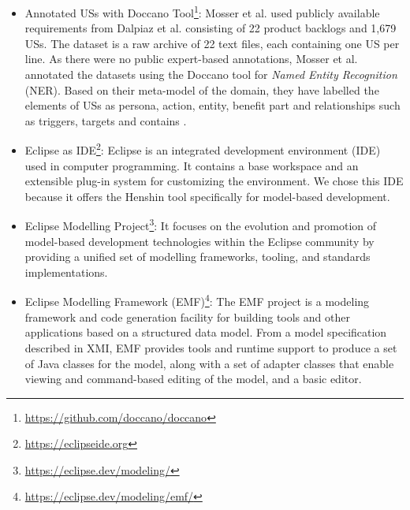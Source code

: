\begin{itemize}
	\item Annotated USs with Doccano Tool\footnote{\href{https://github.com/doccano/doccano}{https://github.com/doccano/doccano}}: Mosser et al. used publicly available requirements from Dalpiaz et al.\cite{Dalpiaz2018} consisting of 22 product backlogs and 1,679 USs. The dataset is a raw archive of 22 text files, each containing one US per line. As there were no public expert-based annotations, Mosser et al. annotated the datasets using the Doccano tool for \textit{Named Entity Recognition} (NER). Based on their meta-model of the domain, they have labelled the elements of USs as persona, action, entity, benefit part and relationships such as triggers, targets and contains \cite{mosser2022modelling}.
	
	
	\item Eclipse as IDE\footnote{\href{https://eclipseide.org/}{https://eclipseide.org}}: Eclipse is an integrated development environment (IDE) used in computer programming. It contains a base workspace and an extensible plug-in system for customizing the environment.
	We chose this IDE because it offers the Henshin tool specifically for model-based development.
	
	\item Eclipse Modelling Project\footnote{\href{https://eclipse.dev/modeling/}{https://eclipse.dev/modeling/}}: It focuses on the evolution and promotion of model-based development technologies within the Eclipse community by providing a unified set of modelling frameworks, tooling, and standards implementations.
	
	\item Eclipse Modelling Framework (EMF)\footnote{\href{https://eclipse.dev/modeling/emf/}{https://eclipse.dev/modeling/emf/}}: The EMF project is a modeling framework and code generation facility for building tools and other applications based on a structured data model. From a model specification described in XMI, EMF provides tools and runtime support to produce a set of Java classes for the model, along with a set of adapter classes that enable viewing and command-based editing of the model, and a basic editor.
	

\end{itemize}
